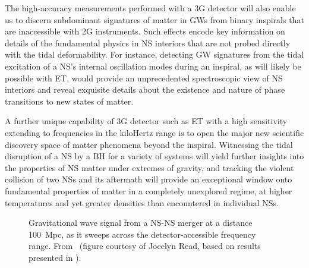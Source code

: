The high-accuracy measurements performed with a 3G detector will also enable us to discern subdominant signatures of matter in GWs from binary inspirals that are inaccessible with 2G instruments. Such effects encode key information on details of the fundamental physics in NS interiors that are not probed directly with the tidal deformability. For instance, detecting GW signatures from the tidal excitation of a NS's internal oscillation modes during an inspiral, as will likely be possible with ET, would provide an unprecedented spectroscopic view of NS interiors and reveal exquisite details about the existence and nature of phase transitions to new states of matter.


A further unique capability of 3G detector such as ET with a high sensitivity extending to frequencies in the kiloHertz range is to open the major new scientific discovery space of matter phenomena beyond the inspiral. Witnessing the tidal disruption of a NS by a BH for a variety of systems will yield further insights into the properties of NS matter under extremes of gravity, and tracking the violent collision of two NSs and its aftermath will provide an exceptional window onto fundamental properties of matter in a completely unexplored regime, at higher temperatures and yet greater densities than encountered in individual NSs. 

\begin{figure}[t]
\vspace*{-0.4cm}
\caption{Gravitational wave signal from a NS-NS merger at a distance 100~Mpc, as it sweeps
  across the detector-accessible frequency range. From~\cite{Maggiore:2018zz} 
(figure courtesy of Jocelyn Read, based on results presented in \cite{Read:2013zra}).
}
\label{fig:merger_phases}
\end{figure}

